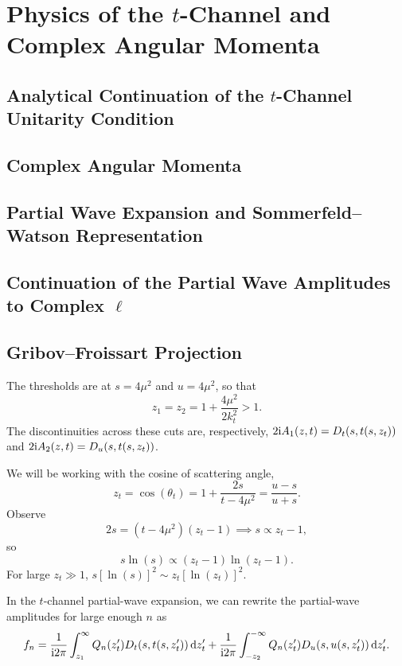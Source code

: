 \chapter{Physics of the \texorpdfstring{$t$}{t}-Channel and Complex Angular Momenta}

\section{Analytical Continuation of the \texorpdfstring{$t$}{t}-Channel Unitarity Condition}
\section{Complex Angular Momenta}
\section{Partial Wave Expansion and Sommerfeld--Watson Representation}
\section{Continuation of the Partial Wave Amplitudes to Complex \texorpdfstring{$\ell$}{l}}
\section{Gribov--Froissart Projection}

\M
The thresholds are at $s=4\mu^{2}$ and $u=4\mu^{2}$, so that
\begin{equation}
z_{1} = z_{2} = 1 + \frac{4\mu^{2}}{2k_{t}^{2}} > 1.
\end{equation}
The discontinuities across these cuts are, respectively, $2\mathrm{i}A_{1}(z,t)=D_{t}(s,t(s,z_{t}))$
and $2\mathrm{i}A_{2}(z,t) = D_{u}(s,t(s,z_{t}))$.

We will be working with the cosine of scattering angle,
\begin{equation}
z_{t} = \cos(\theta_{t}) = 1 + \frac{2s}{t - 4\mu^{2}} = \frac{u-s}{u+s}.
\end{equation}
Observe
\begin{equation}
2s = (t - 4\mu^{2})(z_{t}-1)\implies s\propto z_{t}-1,
\end{equation}
so
\begin{equation}
s\ln(s) \propto (z_{t}-1)\ln(z_{t}-1).
\end{equation}
For large $z_{t}\gg1$, $s[\ln(s)]^{2}\sim z_{t}[\ln(z_{t})]^{2}$.

\M
In the $t$-channel partial-wave expansion,
we can rewrite the partial-wave amplitudes for large enough $n$ as
\begin{equation}
f_{n} = \frac{1}{\mathrm{i}2\pi}\int^{\infty}_{z_{1}}Q_{n}(z_{t}')D_{t}(s,t(s,z_{t}'))\,\mathrm{d} z_{t}'
+ \frac{1}{\mathrm{i}2\pi}\int^{-\infty}_{-z_{2}}Q_{n}(z_{t}')D_{u}(s,u(s,z_{t}'))\,\mathrm{d} z_{t}'.
\end{equation}

